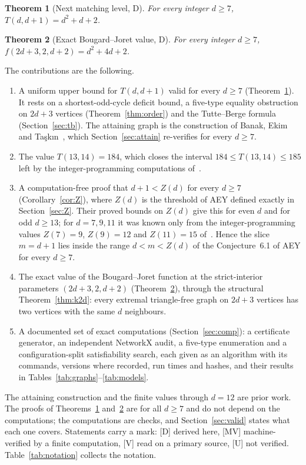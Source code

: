 \documentclass[11pt]{article}
\newtheorem{theorem}{Theorem}
\theoremstyle{remark}
\begin{document}
\begin{theorem}[Next matching level, D]\label{thm:main}
For every integer $d\ge7$, $T(d,d+1)=d^2+d+2$.
\end{theorem}

\begin{theorem}[Exact Bougard--Joret value, D]\label{thm:bjexact}
For every integer $d\ge7$, $f(2d+3,2,d+2)=d^2+4d+2$.
\end{theorem}

The contributions are the following.
\begin{enumerate}
\item A uniform upper bound for $T(d,d+1)$ valid for every $d\ge7$ (Theorem~\ref{thm:main}). It rests on a shortest-odd-cycle deficit bound, a five-type equality obstruction on $2d+3$ vertices (Theorem~\ref{thm:order}) and the Tutte--Berge formula (Section~\ref{sec:tb}). The attaining graph is the construction of Banak, Ekim and Ta\c{s}k\i n~\cite{BET}, which Section~\ref{sec:attain} re-verifies for every $d\ge7$.
\item The value $T(13,14)=184$, which closes the interval $184\le T(13,14)\le185$ left by the integer-programming computations of~\cite{BET}.
\item A computation-free proof that $d+1<Z(d)$ for every $d\ge7$ (Corollary~\ref{cor:Z}), where $Z(d)$ is the threshold of AEY defined exactly in Section~\ref{sec:Z}. Their proved bounds on $Z(d)$ give this for even $d$ and for odd $d\ge13$; for $d=7,9,11$ it was known only from the integer-programming values $Z(7)=9$, $Z(9)=12$ and $Z(11)=15$ of~\cite{BET}. Hence the slice $m=d+1$ lies inside the range $d<m<Z(d)$ of the Conjecture~6.1 of AEY for every $d\ge7$.
\item The exact value of the Bougard--Joret function at the strict-interior parameters $(2d+3,2,d+2)$ (Theorem~\ref{thm:bjexact}), through the structural Theorem~\ref{thm:k2d}: every extremal triangle-free graph on $2d+3$ vertices has two vertices with the same $d$ neighbours.
\item A documented set of exact computations (Section~\ref{sec:comp}): a certificate generator, an independent NetworkX audit, a five-type enumeration and a configuration-split satisfiability search, each given as an algorithm with its commands, versions where recorded, run times and hashes, and their results in Tables~\ref{tab:graphs}--\ref{tab:models}.
\end{enumerate}
The attaining construction and the finite values through $d=12$ are prior work. The proofs of Theorems~\ref{thm:main} and~\ref{thm:bjexact} are for all $d\ge7$ and do not depend on the computations; the computations are checks, and Section~\ref{sec:valid} states what each one covers. Statements carry a mark: [D] derived here, [MV] machine-verified by a finite computation, [V] read on a primary source, [U] not verified. Table~\ref{tab:notation} collects the notation.
\end{document}
